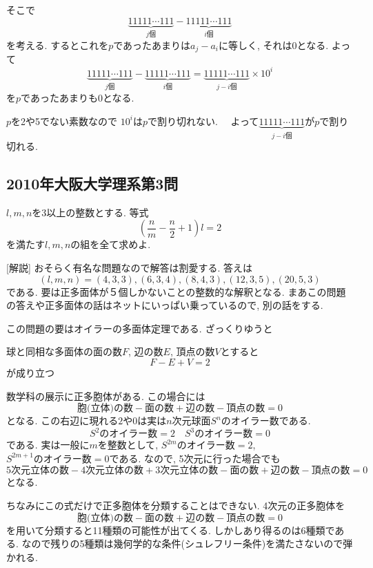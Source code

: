 \documentclass[dvipdfmx,a4paper,12pt]{article} %
\theoremstyle{definition}
\theoremstyle{remark}
\numberwithin{equation}{section}
\begin{document}
そこで
$$\underbrace{11111\cdots 111}_{\text{$j$個}} - 
\underbrace{11111\cdots 111}_{\text{$i$個}} $$
  を考える. 
  するとこれを$p$であったあまりは$a_j - a_i$に等しく, それは0となる. 
 よって
$$
\underbrace{11111\cdots 111}_{\text{$j$個}} - 
\underbrace{11111\cdots 111}_{\text{$i$個}} 
=
\underbrace{11111\cdots 111}_{\text{$j-i$個}} \times 10^{i}$$
を$p$であったあまりも0となる. 

$p$を2や5でない素数なので
$10^{i}$は$p$で割り切れない. 　よって$\underbrace{11111\cdots 111}_{\text{$j-i$個}}$が$p$で割り切れる. 


\subsection{2010年大阪大学理系第3問}

\begin{tcolorbox}[mybox]
$l,m,n$を3以上の整数とする. 等式
$$
\left( \frac{n}{m} - \frac{n}{2} + 1 \right)l = 2
$$
を満たす$l,m,n$の組を全て求めよ. 
\end{tcolorbox}

[解説]
おそらく有名な問題なので解答は割愛する. 
答えは
$$
(l,m,n)
=(4,3,3), (6,3,4), (8,4,3), (12,3,5), (20,5,3)
$$
である. 
要は正多面体が５個しかないことの整数的な解釈となる. 
まあこの問題の答えや正多面体の話はネットにいっぱい乗っているので, 別の話をする. 

この問題の要はオイラーの多面体定理である. 
ざっくりゆうと
\begin{tcolorbox}[mybox]
球と同相な多面体の面の数$F$, 辺の数$E$, 頂点の数$V$とすると
$$
F-E +V=2
$$
が成り立つ
\end{tcolorbox}


数学科の展示に正多胞体がある. この場合には
$$
\text{胞(立体)の数}-\text{面の数}+\text{辺の数}-\text{頂点の数}=0
$$
となる. 
この右辺に現れる$2$や$0$は実は$n$次元球面$S^n$のオイラー数である.
$$
\text{$S^2$のオイラー数}=2 
\quad
\text{$S^3$のオイラー数}=0
$$
である.
 実は一般に$m$を整数として, $\text{$S^{2m}$のオイラー数}=2$, $\text{$S^{2m+1}$のオイラー数}=0$である.
 なので, 5次元に行った場合でも
$$
\text{5次元立体の数}-\text{4次元立体の数}+\text{3次元立体の数}-\text{面の数}+\text{辺の数}-\text{頂点の数}=0
$$
となる. 

ちなみにこの式だけで正多胞体を分類することはできない. 
4次元の正多胞体を
$$
\text{胞(立体)の数}-\text{面の数}+\text{辺の数}-\text{頂点の数}=0
$$
を用いて分類すると11種類の可能性が出てくる. 
しかしあり得るのは6種類である. なので残りの5種類は幾何学的な条件(シュレフリー条件)を満たさないので弾かれる. 
\end{document}
